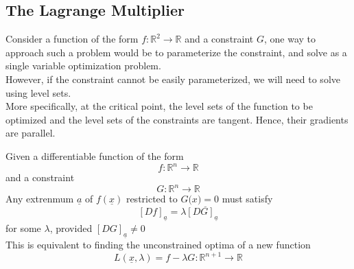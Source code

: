 \subsection{The Lagrange Multiplier}

Consider a function of the form $f: \mathbb{R}^2 \rightarrow \mathbb{R}$ and a constraint $G$, one way to approach such a problem would be to parameterize the constraint, and solve as a single variable optimization problem. \\

However, if the constraint cannot be easily parameterized, we will need to solve using level sets. \\

More specifically, at the critical point, the level sets of the function to be optimized and the level sets of the constraints are tangent. Hence, their gradients are parallel.

\begin{framed}
   Given a differentiable function of the form
   \[
     f: \mathbb{R}^n \rightarrow \mathbb{R}
   \]  and a constraint \[
     G : \mathbb{R}^n \rightarrow \mathbb{R}
   \] Any extrenmum $ \underline{a}$ of $f( \underline{x}) $ restricted to $G( \underline{x) = 0} $ must satisfy
   \[
     \left[ D f \right]_{ \underline{a}}  = \lambda \left[ D G \right]_{ \underline{a}}
   \]  for some $\lambda$, provided $ \left[ D G \right]_{ \underline{a} }  \neq 0$ \\

   This is equivalent to finding the unconstrained optima of a new function
   \[
      L( \underline{x}, \lambda) = f - \lambda G : \mathbb{R}^{n+1} \rightarrow \mathbb{R}
   \] 
\end{framed}






